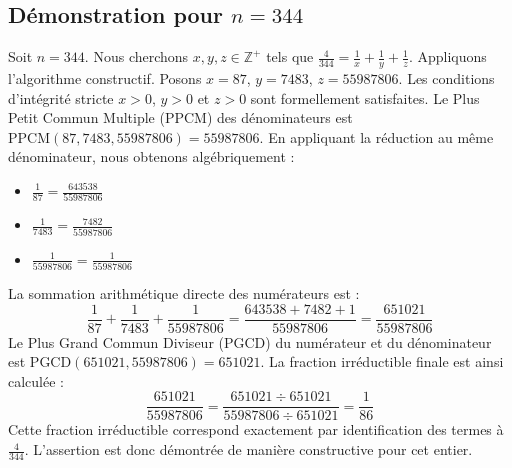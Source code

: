 \documentclass[11pt,a4paper]{article}
\begin{document}
\subsection{Démonstration pour $n = 344$}
Soit $n = 344$. Nous cherchons $x, y, z \in \mathbb{Z}^{+}$ tels que $\frac{4}{344} = \frac{1}{x} + \frac{1}{y} + \frac{1}{z}$.
Appliquons l'algorithme constructif. Posons $x = 87$, $y = 7483$, $z = 55987806$.
Les conditions d'intégrité stricte $x > 0$, $y > 0$ et $z > 0$ sont formellement satisfaites.
Le Plus Petit Commun Multiple (PPCM) des dénominateurs est $\text{PPCM}(87, 7483, 55987806) = 55987806$.
En appliquant la réduction au même dénominateur, nous obtenons algébriquement :
\begin{itemize}
    \item $\frac{1}{87} = \frac{643538}{55987806}$
    \item $\frac{1}{7483} = \frac{7482}{55987806}$
    \item $\frac{1}{55987806} = \frac{1}{55987806}$
\end{itemize}
La sommation arithmétique directe des numérateurs est :
$$ \frac{1}{87} + \frac{1}{7483} + \frac{1}{55987806} = \frac{643538 + 7482 + 1}{55987806} = \frac{651021}{55987806} $$
Le Plus Grand Commun Diviseur (PGCD) du numérateur et du dénominateur est $\text{PGCD}(651021, 55987806) = 651021$.
La fraction irréductible finale est ainsi calculée :
$$ \frac{651021}{55987806} = \frac{651021 \div 651021}{55987806 \div 651021} = \frac{1}{86} $$
Cette fraction irréductible correspond exactement par identification des termes à $\frac{4}{344}$. L'assertion est donc démontrée de manière constructive pour cet entier.
\end{document}
